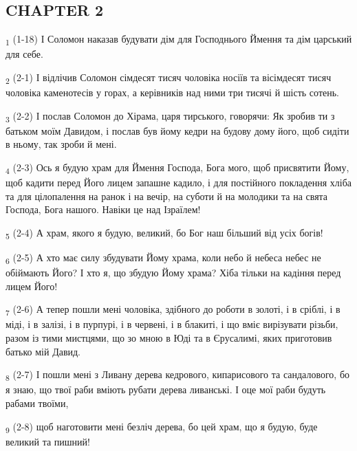 \subsection{CHAPTER 2}
\begin{tcolorbox}
\textsubscript{1} (1-18) І Соломон наказав будувати дім для Господнього Ймення та дім царський для себе.
\end{tcolorbox}
\begin{tcolorbox}
\textsubscript{2} (2-1) І відлічив Соломон сімдесят тисяч чоловіка носіїв та вісімдесят тисяч чоловіка каменотесів у горах, а керівників над ними три тисячі й шість сотень.
\end{tcolorbox}
\begin{tcolorbox}
\textsubscript{3} (2-2) І послав Соломон до Хірама, царя тирського, говорячи: Як зробив ти з батьком моїм Давидом, і послав був йому кедри на будову дому його, щоб сидіти в ньому, так зроби й мені.
\end{tcolorbox}
\begin{tcolorbox}
\textsubscript{4} (2-3) Ось я будую храм для Ймення Господа, Бога мого, щоб присвятити Йому, щоб кадити перед Його лицем запашне кадило, і для постійного покладення хліба та для цілопалення на ранок і на вечір, на суботи й на молодики та на свята Господа, Бога нашого. Навіки це над Ізраїлем!
\end{tcolorbox}
\begin{tcolorbox}
\textsubscript{5} (2-4) А храм, якого я будую, великий, бо Бог наш більший від усіх богів!
\end{tcolorbox}
\begin{tcolorbox}
\textsubscript{6} (2-5) А хто має силу збудувати Йому храма, коли небо й небеса небес не обіймають Його? І хто я, що збудую Йому храма? Хіба тільки на кадіння перед лицем Його!
\end{tcolorbox}
\begin{tcolorbox}
\textsubscript{7} (2-6) А тепер пошли мені чоловіка, здібного до роботи в золоті, і в сріблі, і в міді, і в залізі, і в пурпурі, і в червені, і в блакиті, і що вміє вирізувати різьби, разом із тими мистцями, що зо мною в Юді та в Єрусалимі, яких приготовив батько мій Давид.
\end{tcolorbox}
\begin{tcolorbox}
\textsubscript{8} (2-7) І пошли мені з Ливану дерева кедрового, кипарисового та сандалового, бо я знаю, що твої раби вміють рубати дерева ливанські. І оце мої раби будуть рабами твоїми,
\end{tcolorbox}
\begin{tcolorbox}
\textsubscript{9} (2-8) щоб наготовити мені безліч дерева, бо цей храм, що я будую, буде великий та пишний!
\end{tcolorbox}
